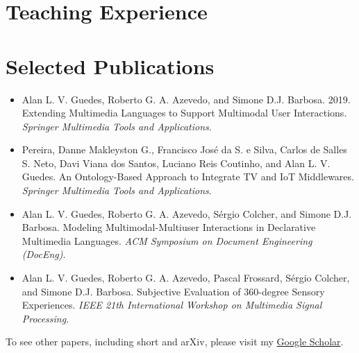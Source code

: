 \documentclass[10pt,a4paper,sans,colorlinks]{moderncv}
\begin{document}

\section{Teaching Experience}

\section{Selected Publications}
\begin{itemize}[mynosep]
  \item Alan L. V. Guedes, Roberto G. A. Azevedo, and Simone D.J. Barbosa. 2019. Extending Multimedia Languages to Support Multimodal User Interactions. \textit{Springer Multimedia Tools and Applications}.
  \item Pereira, Danne Makleyston G., Francisco José da S. e Silva, Carlos de Salles S. Neto, Davi Viana dos Santos, Luciano Reis Coutinho, and Alan L. V. Guedes. An Ontology-Based Approach to Integrate TV and IoT Middlewares. \textit{Springer Multimedia Tools and Applications}.
  \item Alan L. V. Guedes, Roberto G. A. Azevedo, Sérgio Colcher, and Simone D.J. Barbosa. Modeling Multimodal-Multiuser Interactions in Declarative Multimedia Languages. \textit{ACM Symposium on Document Engineering (DocEng)}.
  \item Alan L. V. Guedes, Roberto G. A. Azevedo, Pascal Frossard, Sérgio Colcher, and Simone D.J. Barbosa. Subjective Evaluation of 360-degree Sensory Experiences. \textit{IEEE 21th International Workshop on Multimedia Signal Processing}.
\end{itemize}

To see other papers, including short and arXiv, please visit my \href{https://scholar.google.com/citations?user=1bEOmkUAAAAJ&hl=en}{Google Scholar}.
\end{document}
